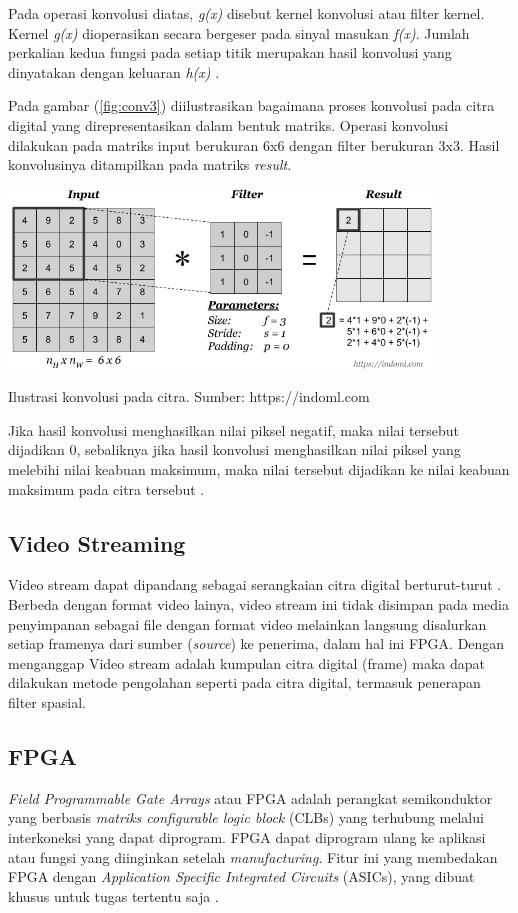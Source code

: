 Pada operasi konvolusi diatas, \textit{g(x)} disebut kernel konvolusi atau filter kernel. Kernel \textit{g(x)} dioperasikan secara bergeser pada sinyal masukan \textit{f(x)}. Jumlah perkalian kedua fungsi pada setiap titik merupakan hasil konvolusi yang dinyatakan dengan keluaran \textit{h(x)} . 

Pada gambar (\ref{fig:conv3}) diilustrasikan bagaimana proses konvolusi pada citra digital yang direpresentasikan dalam bentuk matriks. Operasi konvolusi dilakukan pada matriks input berukuran 6x6 dengan filter berukuran 3x3. Hasil konvolusinya ditampilkan pada matriks \textit{result}.
\begin{afigure}
    \includegraphics[width=0.85\textwidth, center]{images/convolution-operation.png}
    \caption{Ilustrasi konvolusi pada citra. Sumber: https://indoml.com}
    \label{fig:conv3}
\end{afigure}

Jika hasil konvolusi menghasilkan nilai piksel negatif, maka nilai tersebut dijadikan 0, sebaliknya jika hasil konvolusi menghasilkan nilai piksel yang melebihi nilai keabuan maksimum, maka nilai tersebut dijadikan ke nilai keabuan maksimum pada citra tersebut .
 

\subsection{Video Streaming}
Video stream dapat dipandang sebagai serangkaian citra digital berturut-turut . Berbeda dengan format video lainya, video stream ini tidak disimpan pada media penyimpanan sebagai file dengan format video melainkan langsung disalurkan setiap framenya dari sumber (\textit{source}) ke penerima, dalam hal ini FPGA.  Dengan menganggap Video stream adalah kumpulan citra digital (frame) maka dapat dilakukan metode pengolahan seperti pada citra digital, termasuk penerapan filter spasial. 


\subsection{FPGA}
\textit{Field Programmable Gate Arrays} atau FPGA adalah perangkat semikonduktor yang berbasis \textit{matriks configurable logic block} (CLBs) yang terhubung melalui interkoneksi yang dapat diprogram. FPGA dapat diprogram ulang ke aplikasi atau fungsi yang diinginkan setelah \textit{manufacturing}. Fitur ini yang membedakan FPGA dengan \textit{Application Specific Integrated Circuits} (ASICs), yang dibuat khusus untuk tugas tertentu saja .

